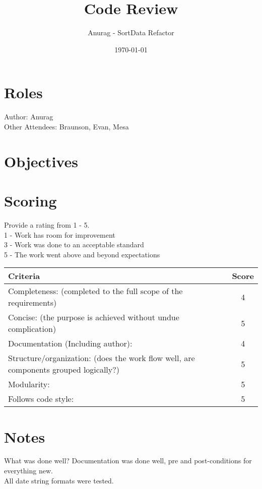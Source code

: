 \documentclass{article}
\title{Code Review}
\author{Anurag - SortData Refactor}
\date{\today}
\begin{document}
\maketitle

\section{Roles}
Author: Anurag\\
Other Attendees: Braunson, Evan, Mesa\\

\section{Objectives}


\section{Scoring}
    Provide a rating from 1 - 5. \\
    1 - Work has room for improvement \\
    3 - Work was done to an acceptable standard \\
    5 - The work went above and beyond expectations\\

\begin{tabular}{|l|c|}
	\hline
	Criteria & Score\\
	\hline
    Completeness:
    (completed to the full scope of the requirements) & 4\\
	\hline
    Concise:
    (the purpose is achieved without undue complication) & 5\\
	\hline
    Documentation (Including author): & 4\\
    \hline
    Structure/organization:
    (does the work flow well, are components grouped logically?) & 5\\
    \hline
    Modularity: & 5\\
    \hline
    Follows code style: & 5\\
    \hline
\end{tabular}

\section{Notes}
    
What was done well? Documentation was done well, pre and post-conditions for everything new.  \\
All date string formats were tested. \\
    
\end{document}

